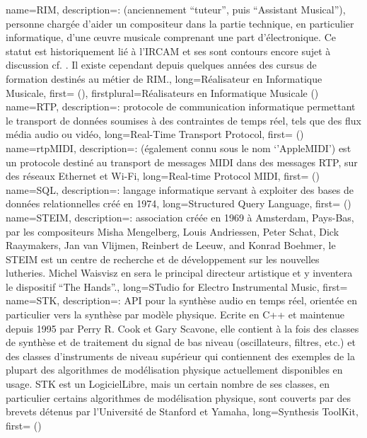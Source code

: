 {
    name={RIM},
    description={\textit{}: (anciennement ``tuteur'', puis ``Assistant Musical''), personne chargée d'aider un compositeur dans la partie technique, en particulier informatique, d'une œuvre musicale comprenant une part d'électronique. Ce statut est historiquement lié à l'\gls{IRCAM} et ses sont contours encore sujet à discussion cf. \cite{zattra_les_2013}. Il existe cependant depuis quelques années des cursus de formation destinés au métier de RIM.},
    long={Réalisateur en Informatique Musicale},
    first={ ()},
    firstplural={Réalisateurs en Informatique Musicale (\glspluralsuffix)}
}
{
    name={RTP},
    description={\textit{}: protocole de communication informatique permettant le transport de données soumises à des contraintes de temps réel, tels que des flux média audio ou vidéo},
    long={Real-Time Transport Protocol},
    first={ ()}
}
{
    name={rtpMIDI},
    description={\textit{}: (également connu sous le nom `'AppleMIDI') est un protocole destiné au transport de messages MIDI dans des messages \gls{RTP}, sur des réseaux Ethernet et Wi-Fi},
    long={Real-time Protocol MIDI},
    first={ ()}
}
{
    name={SQL},
    description={\textit{}: langage informatique servant à exploiter des bases de données relationnelles créé en 1974},
    long={Structured Query Language},
    first={ ()}
}
{
    name={STEIM},
    description={\textit{}: association créée en 1969 à Amsterdam, Pays-Bas, par les compositeurs Misha Mengelberg, Louis Andriessen, Peter Schat, Dick Raaymakers, Jan van Vlijmen, Reinbert de Leeuw, and Konrad Boehmer, le STEIM est un centre de recherche et de développement sur les nouvelles lutheries. Michel Waisvisz en sera le principal directeur artistique et y inventera le dispositif ``The Hands''.},
    long={STudio for Electro Instrumental Music},
    first={}
}
{
    name={STK},
    description={\textit{}: \gls{API} pour la synthèse audio en temps réel, orientée en particulier vers la synthèse par modèle physique. Ecrite en C++ et maintenue depuis 1995 par Perry R. Cook et Gary Scavone, elle contient à la fois des classes de synthèse et de traitement du signal de bas niveau (oscillateurs, filtres, etc.) et des classes d'instruments de niveau supérieur qui contiennent des exemples de la plupart des algorithmes de modélisation physique actuellement disponibles en usage. STK est un \gls{LogicielLibre}, mais un certain nombre de ses classes, en particulier certains algorithmes de modélisation physique, sont couverts par des brevets détenus par l'Université de Stanford et Yamaha},
    long={Synthesis ToolKit},
    first={ ()}
}

